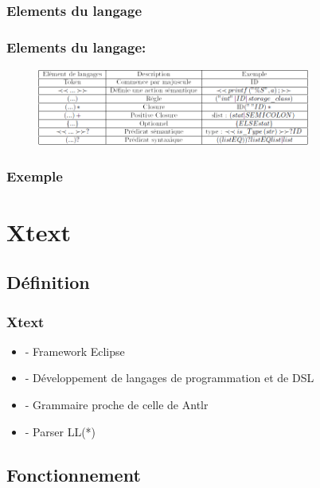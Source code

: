 \documentclass{beamer}
\begin{document}
\subsubsection{Elements du langage}
\begin{frame}
	\frametitle{Elements du langage:}
	
\begin{figure}[h]
	\centering
		\includegraphics[width=0.80\textwidth]{tabantlr.png}
	\label{fig:tabantlr}
\end{figure}
\end{frame} 


\subsubsection{Exemple}



\section{Xtext}

\subsection{Définition}
	
	 
	
	 
	\begin{frame}
	\frametitle{Xtext}
 \begin{itemize}
			\item - Framework Eclipse
			\item - Développement de langages de programmation et de DSL
			\item - Grammaire proche de celle de Antlr
			\item - Parser LL(*) 
\end{itemize}
\end{frame} 



\subsection{Fonctionnement}
\end{document}
